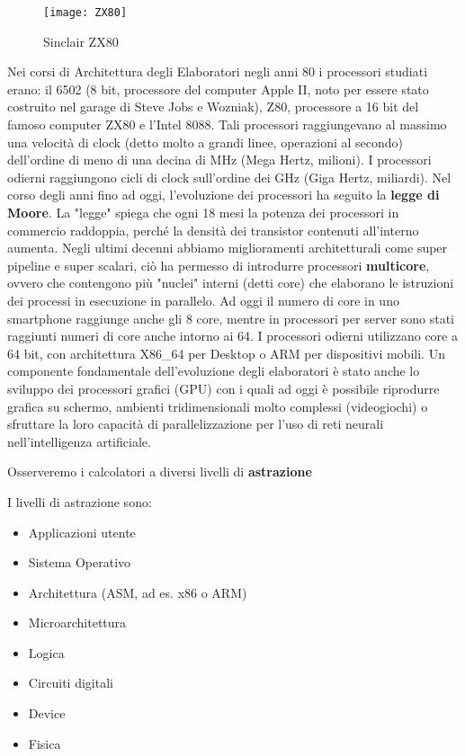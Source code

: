 \begin{figure}
	\centering
	\caption{Sinclair ZX80}
	\texttt{[image: ZX80]}
\end{figure}

Nei corsi di Architettura degli Elaboratori negli anni 80 i processori studiati erano: il 6502 (8 bit, processore del computer Apple II, noto per essere stato costruito nel garage di Steve Jobs e Wozniak), Z80, processore a 16 bit del famoso computer ZX80 e l'Intel 8088. Tali processori raggiungevano al massimo una velocità di clock (detto molto a grandi linee, operazioni al secondo) dell'ordine di meno di una decina di MHz (Mega Hertz, milioni). I processori odierni raggiungono
cicli di clock sull'ordine dei GHz (Giga Hertz, miliardi). Nel corso degli anni fino ad oggi, l'evoluzione dei processori ha seguito la \textbf{legge di Moore}. La "legge" spiega che ogni 18 mesi la potenza dei processori in commercio raddoppia, perché la densità dei transistor contenuti all'interno aumenta. Negli ultimi decenni abbiamo  miglioramenti architetturali come super pipeline e super scalari, ciò ha permesso di introdurre processori \textbf{multicore}, ovvero che contengono più "nuclei" interni (detti core) che elaborano le istruzioni dei processi in esecuzione in parallelo.
Ad oggi il numero di core in uno smartphone raggiunge anche gli 8 core, mentre in processori per server sono stati raggiunti numeri di core anche intorno ai 64. I processori odierni utilizzano core a 64 bit, con architettura X86\_64 per Desktop o ARM per dispositivi mobili.
Un componente fondamentale dell'evoluzione degli elaboratori è stato anche lo sviluppo dei processori grafici (GPU) con i quali ad oggi è possibile riprodurre grafica su schermo, ambienti tridimensionali molto complessi (videogiochi) o sfruttare la loro capacità di parallelizzazione per l'uso di reti neurali nell'intelligenza artificiale.

Osserveremo i calcolatori a diversi livelli di \textbf{astrazione}

I livelli di astrazione sono:
\begin{itemize}
	\item Applicazioni utente
	\item Sistema Operativo
	\item Architettura (ASM, ad es. x86 o ARM)
	\item Microarchitettura
	\item Logica
	\item Circuiti digitali
	\item Device
	\item Fisica
\end{itemize}

